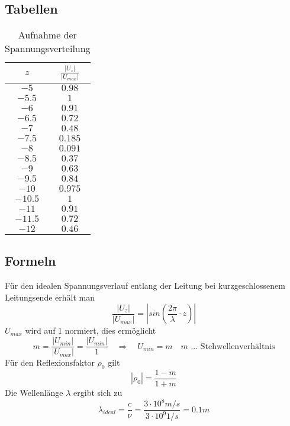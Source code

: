 \documentclass[12pt,a4paper,ngerman]{article}
\begin{document}
\subsection{Tabellen}
\begin{table}[h!]
  \begin{center}
    \begin{tabular}{| c | c |}
    \hline
    $z$  & $\frac{|U_z|}{|U_{max}|}$   \\ \hline \hline
    $-5$ & $0.98$ \\ \hline
    $-5.5$ & $1$ \\ \hline
    $-6$ & $0.91$ \\ \hline
    $-6.5$ & $0.72$ \\ \hline
    $-7$ & $0.48$ \\ \hline
    $-7.5$ & $0.185$ \\ \hline
    $-8$ & $0.091$ \\ \hline
    $-8.5$ & $0.37$ \\ \hline
    $-9$ & $0.63$ \\ \hline
    $-9.5$ & $0.84$ \\ \hline
    $-10$ & $0.975$ \\ \hline
    $-10.5$ & $1$ \\ \hline
    $-11$ & $0.91$ \\ \hline
    $-11.5$ & $0.72$ \\ \hline
    $-12$ & $0.46$ \\ \hline
    \end{tabular}
  \end{center}
  \caption{Aufnahme der Spannungsverteilung}
\end{table}
\subsection{Formeln}
Für den idealen Spannungsverlauf entlang der Leitung bei kurzgeschlossenem Leitungsende erhält man
\begin{equation}
\frac{|U_z|}{|U_{max}|} = \left|sin\left(\frac{2\pi}{\lambda} \cdot z\right)\right|
\end{equation}
$U_{max}$ wird auf 1 normiert, dies ermöglicht
\begin{equation}
m = \frac{|U_{min}|}{|U_{max}|} = \frac{|U_{min}|}{1} \quad \Rightarrow \quad	 U_{min} = m \quad m \text{ ... Stehwellenverhältnis}
\end{equation}
Für den Reflexionsfaktor $\rho_0$ gilt
\begin{equation}
|\rho_0| = \frac{1-m}{1+m}
\end{equation}
Die Wellenlänge $\lambda$ ergibt sich zu
\begin{equation}
\lambda_{ideal} = \frac{c}{\nu} = \frac{3 \cdot 10^8 m/s}{3 \cdot 10^9 1/s} = 0.1m
\end{equation}
\end{document}
